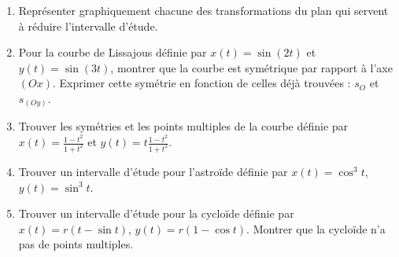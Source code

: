 \begin{frame}
\begin{miniexercice}
\begin{enumerate}
  \item Représenter graphiquement chacune des transformations du plan 
  qui servent à réduire l'intervalle d'étude. 
  
  \item Pour la courbe de Lissajous définie par $x(t)=\sin(2t)$ et
  $y(t)=\sin(3t)$, montrer que la courbe est symétrique par rapport à
  l'axe $(Ox)$. Exprimer cette symétrie en fonction de celles déjà trouvées :
  $s_O$ et $s_{(Oy)}$.
    
  \item Trouver les symétries et les points multiples de la courbe définie par 
  $x(t) = \frac{1-t^2}{1+t^2}$ et $y(t) = t \frac{1-t^2}{1+t^2}$.
  
  \item Trouver un intervalle d'étude pour l'astroïde définie par $x(t) = \cos^3 t$,
  $y(t) = \sin^3 t$.  
  
  \item Trouver un intervalle d'étude pour la cycloïde définie par $x(t) = r(t-\sin t)$,
  $y(t) = r(1-\cos t)$. Montrer que la cycloïde n'a pas de points multiples.

\end{enumerate}
\end{miniexercice}
\end{frame}



